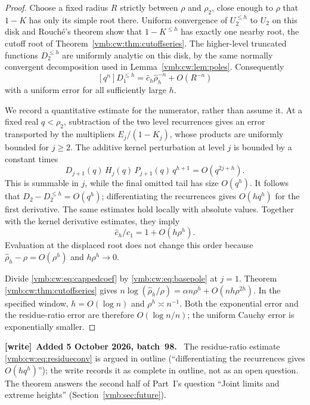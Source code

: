 \documentclass[11pt,a4paper]{article}
\numberwithin{equation}{section}
\theoremstyle{definition}\newtheorem{definition}[theorem]{Definition}
\theoremstyle{remark}\newtheorem{remark}[theorem]{Remark}
\newcommand{\coeff}[2]{[#1^{#2}]}
\newenvironment{writenote}[1][]{\par\smallskip\begingroup\small
 \noindent\textbf{[write]}\if\relax\detokenize{#1}\relax\else~\textbf{#1.}\fi\ }%
 {\par\endgroup\smallskip}
\begin{document}
\begin{proof}
Choose a fixed radius $R$ strictly between $\rho$ and $\rho_2$, close
enough to $\rho$ that $1-K$ has only its simple root there. Uniform
convergence of $U_2^{\le h}$ to $U_2$ on this disk and Rouch\'e's theorem
show that $1-K^{\le h}$ has exactly one nearby root, the cutoff root
of Theorem~\ref{vmb:cw:thm:cutoffseries}. The higher-level truncated functions
$D_2^{\le h}$ are uniformly analytic on this disk, by the same normally
convergent decomposition used in Lemma~\ref{vmb:cw:lem:poles}. Consequently
\begin{equation}\label{vmb:cw:eq:cappedcoef}
 \coeff qn D_1^{\le h}=\hat c_h\widehat\rho_h^{-n}+O(R^{-n})
\end{equation}
with a uniform error for all sufficiently large $h$.

We record a quantitative estimate for the numerator, rather than assume
it. At a fixed real $q<\rho_2$, subtraction of the two level recurrences
gives an error transported by the multipliers $E_j/(1-K_j)$, whose products
are uniformly bounded for $j\ge2$. The additive kernel perturbation at
level $j$ is bounded by a constant times
\[
 D_{j+1}(q)\,H_j(q)\,
 P_{j+1}(q)\,q^{h+1}=O(q^{2j+h}).
\]
This is summable in $j$, while the final omitted tail has size $O(q^h)$.
It follows that $D_2-D_2^{\le h}=O(q^h)$; differentiating the recurrences
gives $O(hq^h)$ for the first derivative. The same estimates hold locally
with absolute values. Together with the kernel derivative estimates, they
imply
\begin{equation}\label{vmb:cw:eq:residueconv}
 \hat c_h/c_1=1+O(h\rho^h).
\end{equation}
Evaluation at the displaced root does not change this order because
$\widehat\rho_h-\rho=O(\rho^h)$ and $h\rho^h\to0$.

Divide \eqref{vmb:cw:eq:cappedcoef} by \eqref{vmb:cw:eq:basepole} at $j=1$. Theorem
\ref{vmb:cw:thm:cutoffseries} gives
$n\log(\widehat\rho_h/\rho)=\alpha n\rho^h+O(nh\rho^{2h})$.
In the specified window, $h=O(\log n)$ and $\rho^h\asymp n^{-1}$.
Both the exponential error and the residue-ratio error are therefore
$O(\log n/n)$; the uniform Cauchy error is exponentially smaller.
\end{proof}

\begin{writenote}[Added 5 October 2026, batch~98]
The residue-ratio estimate \eqref{vmb:cw:eq:residueconv} is argued in outline
(``differentiating the recurrences gives $O(hq^h)$''); the write records it
as complete in outline, not as an open question. The theorem answers the
second half of Part~I's question ``Joint limits and extreme heights''
(Section~\ref{vmb:sec:future}).
\end{writenote}
\end{document}
